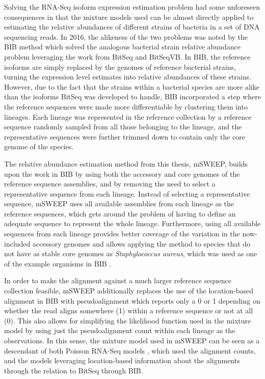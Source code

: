 \documentclass[officiallayout]{tktla}
\begin{document}
Solving the RNA-Seq isoform expression estimation problem had some
unforeseen consequences in that the mixture models used can be almost
directly applied to estimating the relative abundances of different
strains of bacteria in a set of DNA sequencing reads. In 2016, the
alikeness of the two problems was noted by the BIB method
\citep{sankar2016bayesian} which solved the analogous bacterial strain
relative abundance problem leveraging the work from BitSeq and
BitSeqVB. In BIB, the reference isoforms are simply replaced by the
genomes of reference bacterial strains, turning the expression level
estimates into relative abundances of these strains. However, due to
the fact that the strains within a bacterial species are more alike
than the isoforms BitSeq was developed to handle, BIB incorporated a
step where the reference sequences were made more differentiable by
clustering them into lineages. Each lineage was represented in the
reference collection by a reference sequence randomly sampled from all
those belonging to the lineage, and the representative sequences were
further trimmed down to contain only the core genome of the species.

The relative abundance estimation method from this thesis, mSWEEP,
builds upon the work in BIB by using both the accessory and core
genomes of the reference sequence assemblies, and by removing the need
to select a representative sequence from each lineage. Instead of
selecting a representative sequence, mSWEEP uses all available
assemblies from each lineage as the reference sequences, which gets
around the problem of having to define an adequate sequence to
represent the whole lineage. Furthermore, using all available
sequences from each lineage provides better coverage of the variation
in the now-included accessory genomes and allows applying the method
to species that do not have as stable core genomes as
\textit{Staphylococcus aureus}, which was used as one of the example
organisms in BIB \citep{sankar2016bayesian}.

In order to make the alignment against a much larger reference
sequence collection feasible, mSWEEP additionally replaces the use of
the location-based alignment in BIB with pseudoalignment
\citep{bray2016near} which reports only a 0 or 1 depending on whether
the read aligns somewhere (1) within a reference sequence or not at
all (0). This also allows for simplifying the likelihood function used
in the mixture model by using just the pseudoalignment count within
each lineage as the observations. In this sense, the mixture model
used in mSWEEP can be seen as a descendant of both Poisson RNA-Seq
models \citep{jiang2009statistical, wang2010isoform}, which used the
alignment counts, and the models leveraging location-based information
about the alignments \citep{katz2010analysis, li2010rna,
  glaus2012identifying} through the relation to BitSeq through BIB.
\end{document}
